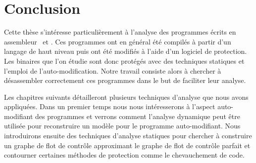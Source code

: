 \section*{Conclusion}
Cette thèse s'intéresse particulièrement à l'analyse des programmes écrits en assembleur \xq\ et \xs. Ces programmes ont en général été compilés à partir d'un langage de haut niveau puis ont été modifiés à l'aide d'un logiciel de protection. Les binaires que l'on étudie sont donc protégés avec des techniques statiques et l'emploi de l'auto-modification. Notre travail consiste alors à chercher à désassembler correctement ces programmes dans le but de faciliter leur analyse.

Les chapitres suivants détailleront plusieurs techniques d'analyse que nous avons appliquées. 
Dans un premier temps nous nous intéresserons à l'aspect auto-modifiant des programmes et verrons comment l'analyse dynamique peut être utilisée pour reconstruire un modèle pour le programme auto-modifiant. 
Nous introduirons ensuite des techniques d'analyse statiques pour chercher à construire un graphe de flot de contrôle approximant le graphe de flot de contrôle parfait et contourner certaines méthodes de protection comme le chevauchement de code.

